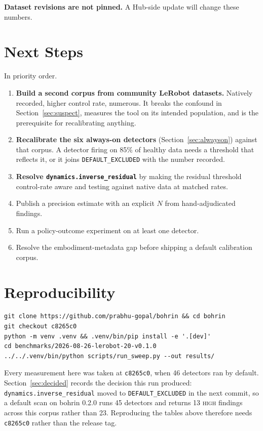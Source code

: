 \documentclass[10pt,a4paper]{article}
\newcommand{\dtr}[1]{\texttt{\small #1}}
\begin{document}
\textbf{Dataset revisions are not pinned.} A Hub-side update will change these numbers.

\section{Next Steps}

In priority order.

\begin{enumerate}\itemsep2pt
\item \textbf{Build a second corpus from community LeRobot datasets.} Natively recorded,
higher control rate, numerous. It breaks the confound in Section~\ref{sec:suspect}, measures
the tool on its intended population, and is the prerequisite for recalibrating anything.
\item \textbf{Recalibrate the six always-on detectors} (Section~\ref{sec:alwayson}) against
that corpus. A detector firing on 85\% of healthy data needs a threshold that reflects it, or
it joins \texttt{DEFAULT\_EXCLUDED} with the number recorded.
\item \textbf{Resolve \dtr{dynamics.inverse\_residual}} by making the residual threshold
control-rate aware and testing against native data at matched rates.
\item Publish a precision estimate with an explicit $N$ from hand-adjudicated findings.
\item Run a policy-outcome experiment on at least one detector.
\item Resolve the embodiment-metadata gap before shipping a default calibration corpus.
\end{enumerate}

\section*{Reproducibility}

\begin{verbatim}
git clone https://github.com/prabhu-gopal/bohrin && cd bohrin
git checkout c8265c0
python -m venv .venv && .venv/bin/pip install -e '.[dev]'
cd benchmarks/2026-08-26-lerobot-20-v0.1.0
../../.venv/bin/python scripts/run_sweep.py --out results/
\end{verbatim}

Every measurement here was taken at \texttt{c8265c0}, when 46 detectors ran by default.
Section~\ref{sec:decided} records the decision this run produced:
\dtr{dynamics.inverse\_residual} moved to \texttt{DEFAULT\_EXCLUDED} in the next commit, so
a default scan on bohrin 0.2.0 runs 45 detectors and returns 13 \textsc{high} findings across
this corpus rather than 23. Reproducing the tables above therefore needs \texttt{c8265c0}
rather than the release tag.
\end{document}
